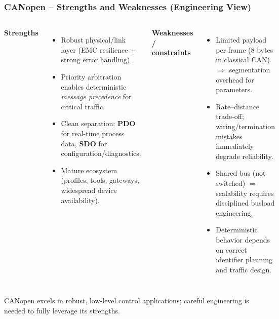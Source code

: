 \begin{frame}
	\frametitle{CANopen -- Strengths and Weaknesses (Engineering View)}
	\small
	\begin{columns}[T,onlytextwidth]
		\textbf{Strengths}
		\begin{itemize}
			\item Robust physical/link layer (EMC resilience + strong error handling).
			\item Priority arbitration enables deterministic \emph{message precedence} for critical traffic.
			\item Clean separation: \textbf{PDO} for real-time process data, \textbf{SDO} for configuration/diagnostics.
			\item Mature ecosystem (profiles, tools, gateways, widespread device availability).
		\end{itemize}
		\textbf{Weaknesses / constraints}
		\begin{itemize}
			\item Limited payload per frame (8 bytes in classical CAN) $\Rightarrow$ segmentation overhead for parameters.
			\item Rate–distance trade-off; wiring/termination mistakes immediately degrade reliability.
			\item Shared bus (not switched) $\Rightarrow$ scalability requires disciplined busload engineering.
			\item Deterministic behavior depends on correct identifier planning and traffic design.
		\end{itemize}
	\end{columns}
	\footnotesize
	CANopen excels in robust, low-level control applications; careful engineering is needed to fully leverage its strengths.
\end{frame}
